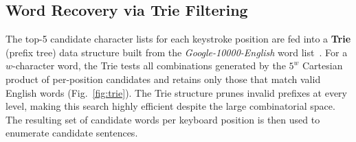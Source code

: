 \documentclass[conference]{IEEEtran}
\begin{document}
\subsection{Word Recovery via Trie Filtering}
The top-5 candidate character lists for each keystroke position are fed into a \textbf{Trie} (prefix tree) data structure built from the \textit{Google-10000-English} word list~\cite{google10k}. For a $w$-character word, the Trie tests all combinations generated by the $5^w$ Cartesian product of per-position candidates and retains only those that match valid English words (Fig.~\ref{fig:trie}). The Trie structure prunes invalid prefixes at every level, making this search highly efficient despite the large combinatorial space. The resulting set of candidate words per keyboard position is then used to enumerate candidate sentences.
\end{document}
